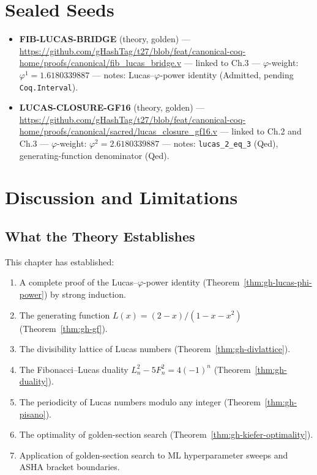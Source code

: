 \section{Sealed Seeds}
\label{sec:gh-seeds}

\begin{itemize}
  \item \textbf{FIB-LUCAS-BRIDGE} (theory, golden) ---
        \url{https://github.com/gHashTag/t27/blob/feat/canonical-coq-home/proofs/canonical/fib_lucas_bridge.v}
        --- linked to Ch.3 ---
        \(\varphi\)-weight: \(\varphi^1 = 1.6180339887\) ---
        notes: Lucas--\(\varphi\)-power identity (Admitted, pending
        \texttt{Coq.Interval}).
  \item \textbf{LUCAS-CLOSURE-GF16} (theory, golden) ---
        \url{https://github.com/gHashTag/t27/blob/feat/canonical-coq-home/proofs/canonical/sacred/lucas_closure_gf16.v}
        --- linked to Ch.2 and Ch.3 ---
        \(\varphi\)-weight: \(\varphi^2 = 2.6180339887\) ---
        notes: \texttt{lucas\_2\_eq\_3} (Qed), generating-function
        denominator (Qed).
\end{itemize}

\section{Discussion and Limitations}
\label{sec:gh-discussion}

\subsection{What the Theory Establishes}
\label{subsec:gh-disc-establishes}

This chapter has established:
\begin{enumerate}
  \item A complete proof of the Lucas--\(\varphi\)-power identity
        (Theorem~\ref{thm:gh-lucas-phi-power}) by strong induction.
  \item The generating function \(L(x) = (2-x)/(1-x-x^2)\)
        (Theorem~\ref{thm:gh-gf}).
  \item The divisibility lattice of Lucas numbers
        (Theorem~\ref{thm:gh-divlattice}).
  \item The Fibonacci--Lucas duality
        \(L_n^2 - 5F_n^2 = 4(-1)^n\)
        (Theorem~\ref{thm:gh-duality}).
  \item The periodicity of Lucas numbers modulo any integer
        (Theorem~\ref{thm:gh-pisano}).
  \item The optimality of golden-section search
        (Theorem~\ref{thm:gh-kiefer-optimality}).
  \item Application of golden-section search to ML hyperparameter
        sweeps and ASHA bracket boundaries.
\end{enumerate}

